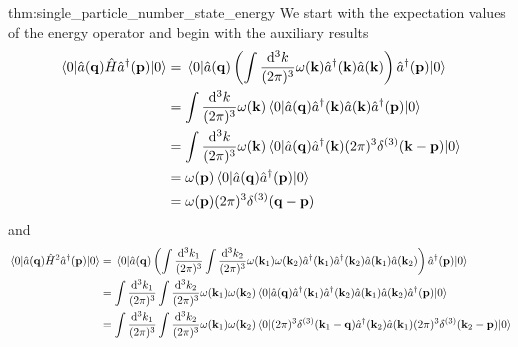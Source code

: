 \begin{delayedproof}{thm:single_particle_number_state_energy}
	We start with the expectation values of the energy operator and begin with the auxiliary results
	\begin{equation}
		\begin{split}
			\expval{\hat{a}(\vb{q})\hat{H}\hat{a}^\dagger(\vb{p})}{0}
			&=
			\expval{
				\hat{a}(\vb{q})
				\left(
					\int\frac{\dd[3]{k}}{(2\pi)^3}
					\omega(\vb{k})
					\hat{a}^\dagger(\vb{k})
					\hat{a}(\vb{k})
				\right)
				\hat{a}^\dagger(\vb{p})
			}{0}
			\\
			&=
			\int\frac{\dd[3]{k}}{(2\pi)^3}
			\omega(\vb{k})
			\expval{
				\hat{a}(\vb{q})
				\hat{a}^\dagger(\vb{k})
				\hat{a}(\vb{k})
				\hat{a}^\dagger(\vb{p})
			}{0}
			\\
			&=
			\int\frac{\dd[3]{k}}{(2\pi)^3}
			\omega(\vb{k})
			\expval{
				\hat{a}(\vb{q})
				\hat{a}^\dagger(\vb{k})
				(2\pi)^3\delta^{(3)}(\vb{k}-\vb{p})
			}{0}
			\\
			&=
			\omega(\vb{p})
			\expval{
				\hat{a}(\vb{q})
				\hat{a}^\dagger(\vb{p})
			}{0}
			\\
			&=
			\omega(\vb{p})
			(2\pi)^3\delta^{(3)}(\vb{q}-\vb{p})
		\end{split}
	\end{equation}
	and
	\begin{equation}
		\begin{split}
			\expval{
				\hat{a}(\vb{q})
				\hat{H}^2\hat{a}^\dagger(\vb{p})
			}{0}
			&=
			\expval{
				\hat{a}(\vb{q})
				\left(
					\int\frac{\dd[3]{k_1}}{(2\pi)^3}
					\int\frac{\dd[3]{k_2}}{(2\pi)^3}
					\omega(\vb{k}_1)
					\omega(\vb{k}_2)
					\hat{a}^\dagger(\vb{k}_1)
					\hat{a}^\dagger(\vb{k}_2)
					\hat{a}(\vb{k}_1)
					\hat{a}(\vb{k}_2)
				\right)
				\hat{a}^\dagger(\vb{p})
			}{0}
			\\
			&=
			\int\frac{\dd[3]{k_1}}{(2\pi)^3}
			\int\frac{\dd[3]{k_2}}{(2\pi)^3}
			\omega(\vb{k}_1)
			\omega(\vb{k}_2)
			\expval{
				\hat{a}(\vb{q})
				\hat{a}^\dagger(\vb{k}_1)
				\hat{a}^\dagger(\vb{k}_2)
				\hat{a}(\vb{k}_1)
				\hat{a}(\vb{k}_2)
				\hat{a}^\dagger(\vb{p})
			}{0}
			\\
			&=
			\int\frac{\dd[3]{k_1}}{(2\pi)^3}
			\int\frac{\dd[3]{k_2}}{(2\pi)^3}
			\omega(\vb{k}_1)
			\omega(\vb{k}_2)
			\expval{
				(2\pi)^3
				\delta^{(3)}(\vb{k}_1-\vb{q})
				\hat{a}^\dagger(\vb{k}_2)
				\hat{a}(\vb{k}_1)
				(2\pi)^3
				\delta^{(3)}(\vb{k}_2-\vb{p})
			}{0}
			\\

\end{split}
\end{equation}
\end{delayedproof}
